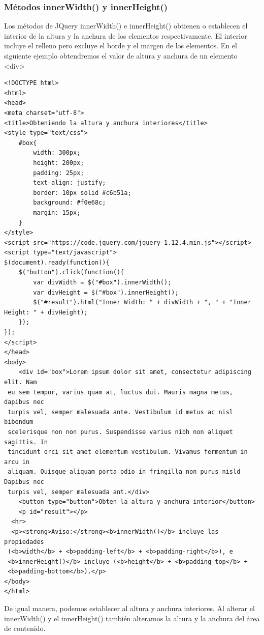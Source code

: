 \documentclass[a4paper, oneside]{article}
\begin{document}
\subsubsection{Métodos innerWidth() y innerHeight()}
\label{sec:orge548e0f}

Los métodos de JQuery innerWidth() e innerHeight() obtienen o establecen el interior de la altura y la anchura de los elementos respectivamente. El interior incluye el relleno pero excluye el borde y el margen de los elementos. En el siguiente ejemplo obtendremos el valor de altura y anchura de un elemento <div>

\begin{verbatim}
<!DOCTYPE html>
<html>
<head>
<meta charset="utf-8">
<title>Obteniendo la altura y anchura interiores</title>
<style type="text/css">
    #box{
        width: 300px;
        height: 200px;
        padding: 25px;
        text-align: justify;
        border: 10px solid #c6b51a;
        background: #f0e68c;
        margin: 15px;
    }        
</style>
<script src="https://code.jquery.com/jquery-1.12.4.min.js"></script>
<script type="text/javascript">
$(document).ready(function(){
    $("button").click(function(){
        var divWidth = $("#box").innerWidth();
        var divHeight = $("#box").innerHeight();
        $("#result").html("Inner Width: " + divWidth + ", " + "Inner Height: " + divHeight);
    });
});
</script>
</head>
<body>
    <div id="box">Lorem ipsum dolor sit amet, consectetur adipiscing elit. Nam
 eu sem tempor, varius quam at, luctus dui. Mauris magna metus, dapibus nec
 turpis vel, semper malesuada ante. Vestibulum id metus ac nisl bibendum
 scelerisque non non purus. Suspendisse varius nibh non aliquet sagittis. In
 tincidunt orci sit amet elementum vestibulum. Vivamus fermentum in arcu in
 aliquam. Quisque aliquam porta odio in fringilla non purus nisld Dapibus nec
 turpis vel, semper malesuada ant.</div>
    <button type="button">Obten la altura y anchura interior</button>
    <p id="result"></p>
  <hr>
  <p><strong>Aviso:</strong><b>innerWidth()</b> incluye las propiedades
 (<b>width</b> + <b>padding-left</b> + <b>padding-right</b>), e
 <b>innerHeight()</b> incluye (<b>height</b> + <b>padding-top</b> +
 <b>padding-bottom</b>).</p>
</body>
</html>                                		
\end{verbatim}

De igual manera, podemos establecer al altura y anchura interiores. Al alterar el innerWidth() y el innerHeight() también alteramos la altura y la anchura del área de contenido.
\end{document}
